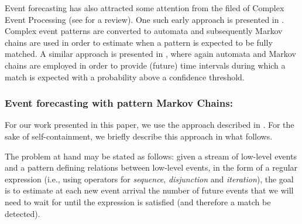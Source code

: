 Event forecasting has also attracted some attention from the filed of Complex Event Processing (see \cite{Cugola:2012:PFI:2187671.2187677} for a review).
One such early approach is presented in \cite{muthusamy_predictive_2010}.
Complex event patterns are converted to automata and subsequently
Markov chains are used in order to estimate when a pattern is expected to be fully matched.
A similar approach is presented in \cite{alevizos2017event},
where again automata and Markov chains are employed in order to provide (future) time intervals during which a match is expected with a probability above a confidence threshold. 

\subsubsection*{Event forecasting with pattern Markov Chains:}

For our work presented in this paper,
we use the approach described in \cite{alevizos2017event}.
For the sake of self-containment,
we briefly describe this approach in what follows.

The problem at hand may be stated as follows: given a stream of low-level events and a pattern defining relations between low-level events, 
in the form of a regular expression (i.e., using operators for \textit{sequence}, \textit{disjunction} and \textit{iteration}),
the goal is to estimate at each new event arrival the number of future events
that we will need to wait for until the expression is satisfied (and therefore a match be detected).

